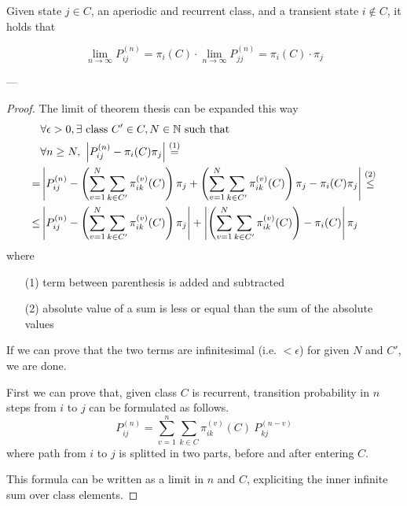 	\begin{theorem}[3.1, KT p. 91] \label{th:3.1}
		Given state $j \in C$, an aperiodic and recurrent class, and a transient state $i \notin C$, it holds that

		$$ \lim_{n \to \infty } P_{ij}^{(n)} = \pi_i(C) \cdot \lim_{n \to \infty } P_{jj}^{(n)} = \pi_i(C) \cdot \pi_j $$
	\end{theorem}
	---
	\begin{proof}
		The limit of theorem thesis can be expanded this way
		\begin{equation}\begin{split} \label{eq:theorem_3.1_thesis}
			& \forall \epsilon > 0, \exists \text{ class } C' \in C, N \in \mathbb{N} \text{ such that } \\
			& \forall n \ge N,~ \left| P_{ij}^{(n)} - \pi_i(C) \pi_j \right| \stackrel{(1)}{=} \\
			= & \left| P_{ij}^{(n)} - \left( \sum_{v = 1}^{N} \sum_{k \in C'} \pi_{ik}^{(v)}(C) \right) \pi_j +
				\left( \sum_{v = 1}^{N} \sum_{k \in C'} \pi_{ik}^{(v)}(C)\right)\pi_j - \pi_i(C)\pi_j \right| \stackrel{(2)}{\le} \\
			\le & \left| P_{ij}^{(n)} - \left( \sum_{v = 1}^{N} \sum_{k \in C'} \pi_{ik}^{(v)}(C) \right) \pi_j \right| +
				\left| \left( \sum_{v = 1}^{N} \sum_{k \in C'} \pi_{ik}^{(v)}(C)\right) - \pi_i(C) \right| \pi_j
		\end{split}\end{equation}
		where
		\begin{itemize}
			\item [(1)] term between parenthesis is added and subtracted
			\item [(2)] absolute value of a sum is less or equal than the sum of the absolute values
		\end{itemize}

		If we can prove that the two terms are infinitesimal (i.e. $< \epsilon$) for given $N$ and $C'$, we are done.
		\smallbreak

		First we can prove that, given class $C$ is recurrent, transition probability in $n$ steps from $i$ to $j$ can be formulated as follows.
		\begin{equation} \label{eq:n_step_in_class}
			P_{ij}^{(n)} = \sum_{v = 1}^{n} \sum_{k \in C} \pi_{ik}^{(v)}(C) ~ P_{kj}^{(n-v)}
		\end{equation}
		where path from $i$ to $j$ is splitted in two parts, before and after entering $C$.

		This formula can be written as a limit in $n$ and $C$, expliciting the inner infinite sum over class elements.


\end{proof}

